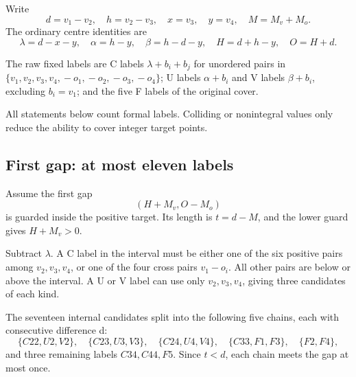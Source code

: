 \documentclass[10pt,a4paper]{article}
\theoremstyle{definition}
\begin{document}
Write \[
d=\allowbreak{}v_1-v_2,\allowbreak{}\quad h=\allowbreak{}v_2-v_3,\allowbreak{}\quad x=\allowbreak{}v_3,\allowbreak{}\quad y=\allowbreak{}v_4,\allowbreak{}
\quad M=\allowbreak{}M_v+\allowbreak{}M_o.
\] The ordinary centre identities are \[
\lambda=\allowbreak{}d-x-y,\allowbreak{}\quad\alpha=\allowbreak{}h-y,\allowbreak{}\quad\beta=\allowbreak{}h-d-y,\allowbreak{}
\quad H=\allowbreak{}d+\allowbreak{}h-y,\allowbreak{}\quad O=\allowbreak{}H+\allowbreak{}d.
\]

The raw fixed labels are C labels \(\lambda+\allowbreak{}b_i+\allowbreak{}b_j\) for unordered
pairs in \(\{v_1,\allowbreak{}v_2,\allowbreak{}v_3,\allowbreak{}v_4,\allowbreak{}-o_1,\allowbreak{}-o_2,\allowbreak{}-o_3,\allowbreak{}-o_4\}\); U labels
\(\alpha+\allowbreak{}b_i\) and V labels \(\beta+\allowbreak{}b_i\),\allowbreak{} excluding \(b_i=\allowbreak{}v_1\); and
the five F labels of the original cover.

All statements below count formal labels. Colliding or nonintegral
values only reduce the ability to cover integer target points.

\hypertarget{first-gap-at-most-eleven-labels}{%
\subsection{First gap: at most eleven
labels}\label{first-gap-at-most-eleven-labels}}

Assume the first gap \[
(H+\allowbreak{}M_v,\allowbreak{}O-M_o)
\] is guarded inside the positive target. Its length is \(t=\allowbreak{}d-M\),\allowbreak{} and
the lower guard gives \(H+\allowbreak{}M_v>0\).

Subtract \(\lambda\). A C label in the interval must be either one of
the six positive pairs among \(v_2,\allowbreak{}v_3,\allowbreak{}v_4\),\allowbreak{} or one of the four cross
pairs \(v_1-o_i\). All other pairs are below or above the interval. A U
or V label can use only \(v_2,\allowbreak{}v_3,\allowbreak{}v_4\),\allowbreak{} giving three candidates of each
kind.

The seventeen internal candidates split into the following five chains,\allowbreak{}
each with consecutive difference d: \[
\{C22,\allowbreak{}U2,\allowbreak{}V2\},\allowbreak{}\quad\{C23,\allowbreak{}U3,\allowbreak{}V3\},\allowbreak{}\quad\{C24,\allowbreak{}U4,\allowbreak{}V4\},\allowbreak{}
\quad\{C33,\allowbreak{}F1,\allowbreak{}F3\},\allowbreak{}\quad\{F2,\allowbreak{}F4\},\allowbreak{}
\] and three remaining labels \(C34,\allowbreak{}C44,\allowbreak{}F5\). Since \(t<d\),\allowbreak{} each chain
meets the gap at most once.
\end{document}
